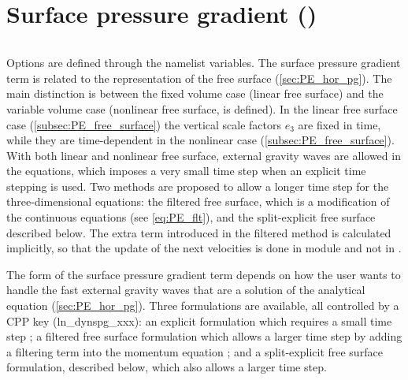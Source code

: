 \documentclass[../tex_main/NEMO_manual]{subfiles}
\begin{document}
\section{Surface pressure gradient (\protect{})}
\label{sec:DYN_spg}


$\ $\newline      %

Options are defined through the  namelist variables.
The surface pressure gradient term is related to the representation of the free surface (\autoref{sec:PE_hor_pg}). 
The main distinction is between the fixed volume case (linear free surface) and the variable volume case 
(nonlinear free surface,  is defined). In the linear free surface case (\autoref{subsec:PE_free_surface}) 
the vertical scale factors $e_{3}$ are fixed in time, while they are time-dependent in the nonlinear case 
(\autoref{subsec:PE_free_surface}). 
With both linear and nonlinear free surface, external gravity waves are allowed in the equations, 
which imposes a very small time step when an explicit time stepping is used. 
Two methods are proposed to allow a longer time step for the three-dimensional equations: 
the filtered free surface, which is a modification of the continuous equations (see \autoref{eq:PE_flt}), 
and the split-explicit free surface described below. 
The extra term introduced in the filtered method is calculated implicitly, 
so that the update of the next velocities is done in module  and not in .


The form of the surface pressure gradient term depends on how the user wants to handle 
the fast external gravity waves that are a solution of the analytical equation (\autoref{sec:PE_hor_pg}). 
Three formulations are available, all controlled by a CPP key (ln\_dynspg\_xxx):
an explicit formulation which requires a small time step ;
a filtered free surface formulation which allows a larger time step by adding a filtering 
term into the momentum equation ; 
and a split-explicit free surface formulation, described below, which also allows a larger time step.
\end{document}
